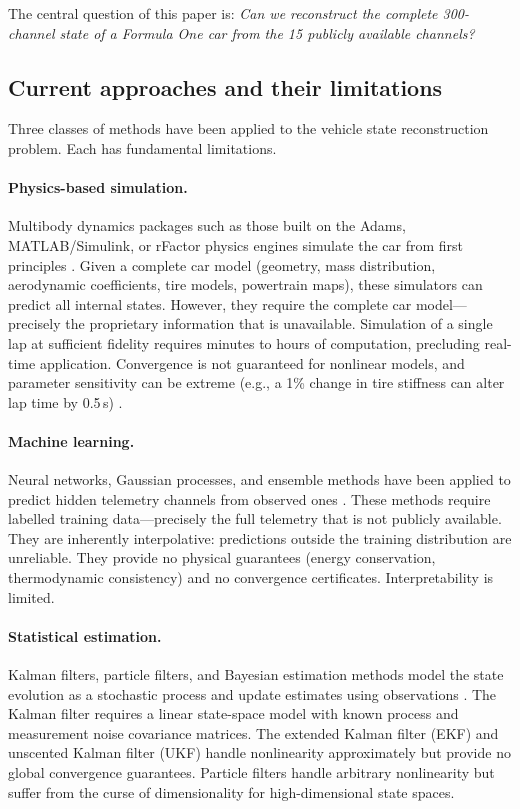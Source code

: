 \documentclass[twocolumn,10pt,a4paper]{article}
\theoremstyle{definition}
\theoremstyle{remark}
\begin{document}
The central question of this paper is: \emph{Can we reconstruct the complete 300-channel state of a Formula One car from the 15 publicly available channels?}

\subsection{Current approaches and their limitations}

Three classes of methods have been applied to the vehicle state reconstruction problem. Each has fundamental limitations.

\paragraph{Physics-based simulation.} Multibody dynamics packages such as those built on the Adams, MATLAB/Simulink, or rFactor physics engines simulate the car from first principles \citep{Gillespie1992, Milliken1995}. Given a complete car model (geometry, mass distribution, aerodynamic coefficients, tire models, powertrain maps), these simulators can predict all internal states. However, they require the complete car model---precisely the proprietary information that is unavailable. Simulation of a single lap at sufficient fidelity requires minutes to hours of computation, precluding real-time application. Convergence is not guaranteed for nonlinear models, and parameter sensitivity can be extreme (e.g., a 1\% change in tire stiffness can alter lap time by 0.5\,s) \citep{Pacejka2012}.

\paragraph{Machine learning.} Neural networks, Gaussian processes, and ensemble methods have been applied to predict hidden telemetry channels from observed ones \citep{Bishop2006}. These methods require labelled training data---precisely the full telemetry that is not publicly available. They are inherently interpolative: predictions outside the training distribution are unreliable. They provide no physical guarantees (energy conservation, thermodynamic consistency) and no convergence certificates. Interpretability is limited.

\paragraph{Statistical estimation.} Kalman filters, particle filters, and Bayesian estimation methods model the state evolution as a stochastic process and update estimates using observations \citep{Kalman1960, Kay1993}. The Kalman filter requires a linear state-space model with known process and measurement noise covariance matrices. The extended Kalman filter (EKF) and unscented Kalman filter (UKF) handle nonlinearity approximately but provide no global convergence guarantees. Particle filters handle arbitrary nonlinearity but suffer from the curse of dimensionality for high-dimensional state spaces.
\end{document}
